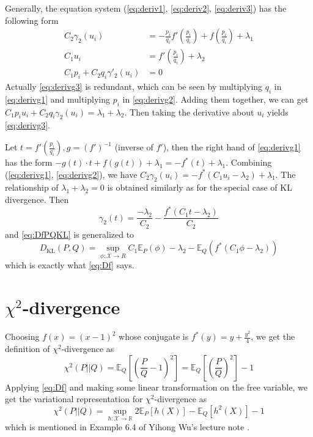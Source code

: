 \documentclass{article}
\theoremstyle{definition}
\begin{document}
Generally, the equation system (\ref{eq:deriv1}, \ref{eq:deriv2}, \ref{eq:deriv3})
has the following form
\begin{align}
C_2 \gamma_2(u_i) & = -\frac{p_i}{q_i}f'(\frac{p_i}{q_i}) + f(\frac{p_i}{q_i}) + \lambda_1 \label{eq:derivg1}\\
C_1 u_i & = f'( \frac{p_i}{q_i}) + \lambda_2 \label{eq:derivg2}\\
C_1 p_i + C_2 q_i \gamma'_2(u_i) &= 0 \label{eq:derivg3}
\end{align}
Actually \eqref{eq:derivg3} is redundant, which can be seen by multiplying $q_i$
in \eqref{eq:derivg1} and multiplying $p_i$ in \eqref{eq:derivg2}. Adding them together,
we can get
$C_1 p_i u_i + C_2 q_i\gamma_2 (u_i)  = \lambda_1 + \lambda_2$. Then taking the derivative about
$u_i$ yields \eqref{eq:derivg3}.

Let $t=f'(\frac{p_i}{q_i}), g= (f')^{-1}$ (inverse of $f'$), then the right hand of \eqref{eq:derivg1} has the form
$-g(t) \cdot t + f(g(t))+\lambda_1 = -f^*(t) + \lambda_1$.
Combining (\ref{eq:derivg1}, \ref{eq:derivg2}), we have
$C_2 \gamma_2(u_i) = -f^*(C_1 u_i - \lambda_2) + \lambda_1$.
The relationship of $\lambda_1 + \lambda_2 = 0$ is obtained similarly as for the special case
of KL divergence. Then
\begin{equation}
\gamma_2(t) = \frac{-\lambda_2}{C_2} - \frac{f^*(C_1 t - \lambda_2)}{C_2}
\end{equation}
and \eqref{eq:DfPQKL} is generalized to
\begin{equation}
D_{\textrm{KL}}(P, Q) = \sup_{\phi: \mathcal{X} \to R} C_1 \mathbb{E}_P(\phi) -\lambda_2  - \mathbb{E}_Q(f^*(C_1 \phi - \lambda_2))
\end{equation}
which is exactly what \eqref{eq:Df} says.
\section{$\chi^2$-divergence}
Choosing $f(x)=(x-1)^2$ whose conjugate is $f^*(y)=y+\frac{y^2}{4}$,
we get the definition of $\chi^2$-divergence as
\begin{equation}
\chi^2(P||Q) = \mathbb{E}_Q[(\frac{P}{Q}-1)^2] =\mathbb{E}_Q[(\frac{P}{Q})^2] -1
\end{equation}
Applying \eqref{eq:Df} and
making some linear transformation on the free variable, we get the
variational representation for $\chi^2$-divergence as
\begin{equation}\label{eq:chisquare_div}
\chi^2(P||Q) = \sup_{h: \mathcal{X} \to \mathbb{R}} 2\mathbb{E}_P[h(X)]
-\mathbb{E}_Q[h^2(X)] -1
\end{equation}
which is mentioned in Example 6.4 of Yihong Wu's lecture note \cite{yihong}.
\end{document}
